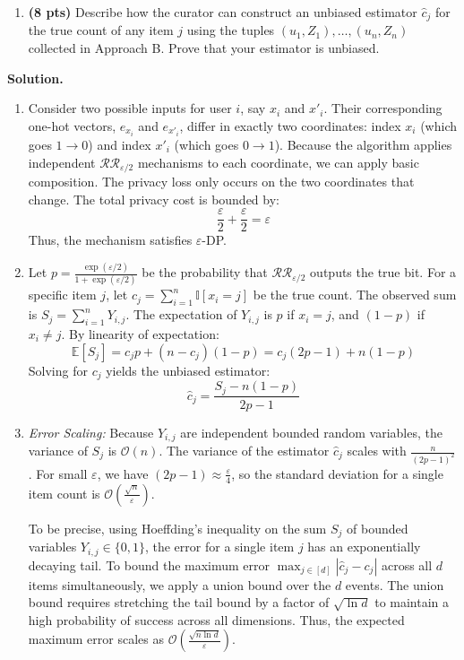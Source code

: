 \documentclass[12pt]{article}
\begin{document}
\begin{enumerate}
\begin{enumerate}
    \item[(e)] \textbf{(8 pts)}  Describe how the curator can construct an unbiased estimator $\hat{c}_j$ for the true count of any item $j$ using the tuples $(u_1, Z_1), \dots, (u_n, Z_n)$ collected in Approach B. Prove that your estimator is unbiased.
\end{enumerate}

\begin{solution}
\textbf{Solution.}\\
\begin{enumerate}
\item[(a)] 
Consider two possible inputs for user $i$, say $x_i$ and $x'_i$. Their corresponding one-hot vectors, $e_{x_i}$ and $e_{x'_i}$, differ in exactly two coordinates: index $x_i$ (which goes $1 \to 0$) and index $x'_i$ (which goes $0 \to 1$). 
Because the algorithm applies independent $\mathcal{R}\mathcal{R}_{\varepsilon/2}$ mechanisms to each coordinate, we can apply basic composition. The privacy loss only occurs on the two coordinates that change. The total privacy cost is bounded by:
\[
\frac{\varepsilon}{2} + \frac{\varepsilon}{2} = \varepsilon
\]
Thus, the mechanism satisfies $\varepsilon$-DP.

\item[(b)] 
Let $p = \frac{\exp(\varepsilon/2)}{1 + \exp(\varepsilon/2)}$ be the probability that $\mathcal{R}\mathcal{R}_{\varepsilon/2}$ outputs the true bit. 
For a specific item $j$, let $c_j = \sum_{i=1}^n \mathbb{I}[x_i = j]$ be the true count. The observed sum is $S_j = \sum_{i=1}^n Y_{i,j}$.
The expectation of $Y_{i,j}$ is $p$ if $x_i = j$, and $(1-p)$ if $x_i \neq j$. By linearity of expectation:
\[
\mathbb{E}[S_j] = c_j p + (n - c_j)(1-p) = c_j(2p-1) + n(1-p)
\]
Solving for $c_j$ yields the unbiased estimator:
\[
\hat{c}_j = \frac{S_j - n(1-p)}{2p-1}
\]

\item[(c)] 
\textit{Error Scaling:} Because $Y_{i,j}$ are independent bounded random variables, the variance of $S_j$ is $\mathcal{O}(n)$. The variance of the estimator $\hat{c}_j$ scales with $\frac{n}{(2p-1)^2}$. For small $\varepsilon$, we have $(2p-1) \approx \frac{\varepsilon}{4}$, so the standard deviation for a single item count is $\mathcal{O}\left(\frac{\sqrt{n}}{\varepsilon}\right)$. 

To be precise, using Hoeffding's inequality on the sum $S_j$ of bounded variables $Y_{i,j} \in \{0, 1\}$, the error for a single item $j$ has an exponentially decaying tail. To bound the maximum error $\max_{j \in [d]} |\hat{c}_j - c_j|$ across all $d$ items simultaneously, we apply a union bound over the $d$ events. The union bound requires stretching the tail bound by a factor of $\sqrt{\ln d}$ to maintain a high probability of success across all dimensions. Thus, the expected maximum error scales as $\mathcal{O}\left( \frac{\sqrt{n \ln d}}{\varepsilon} \right)$.


\end{enumerate}
\end{solution}
\end{enumerate}
\end{document}
